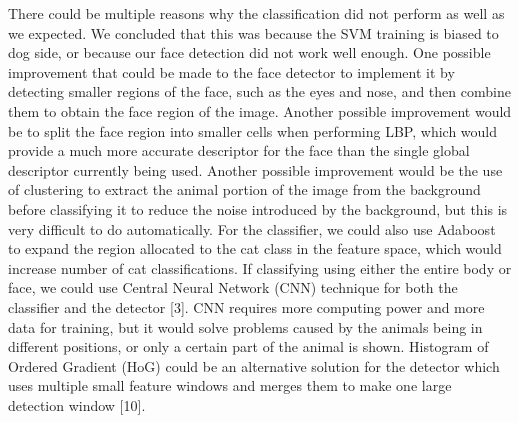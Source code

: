 \documentclass[conference,compsoc]{IEEEtran}
\begin{document}
There could be multiple reasons why the classification did not perform as well as we expected. We concluded that this was because the SVM training is biased to dog side, or because our face detection did not work well enough. One possible improvement that could be made to the face detector to implement it by detecting smaller regions of the face, such as the eyes and nose, and then combine them to obtain the face region of the image. Another possible improvement would be to split the face region into smaller cells when performing LBP, which would provide a much more accurate descriptor for the face than the single global descriptor currently being used. Another possible improvement would be the use of clustering to extract the animal portion of the image from the background before classifying it to reduce the noise introduced by the background, but this is very difficult to do automatically. For the classifier, we could also use Adaboost to expand the region allocated to the cat class in the feature space, which would increase number of cat classifications. If classifying using either the entire body or face, we could use Central Neural Network (CNN) technique for both the classifier and the detector [3]. CNN requires more computing power and more data for training, but it would solve problems caused by the animals being in different positions, or only a certain part of the animal is shown. Histogram of Ordered Gradient (HoG) could be an alternative solution for the detector which uses multiple small feature windows and merges them to make one large detection window [10].




\end{document}
